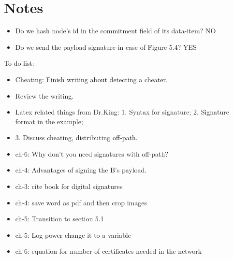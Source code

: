 \chapter{Notes}

\begin{itemize}
	\item Do we hash node's id in the commitment field of its data-item? NO
	\item Do we send the payload signature in case of Figure 5.4? YES
\end{itemize}

To do list:
\begin{itemize}
	\item Cheating: Finish writing about detecting a cheater.
	\item Review the writing.

	\item Latex related things from Dr.King: 1. Syntax for signature; 2. Signature format in the example; 
	\item 3. Discuss cheating, distributing off-path.  
	\item ch-6: Why don't you need signatures with off-path?
	\item ch-4: Advantages of signing the B's payload.

	\item ch-3: cite book for digital signatures

	\item ch-4: save word as pdf and then crop images
	\item ch-5: Transition to section 5.1
	\item ch-5: Log power change it to a variable
	\item ch-6: equation for number of certificates needed in the network

\end{itemize}